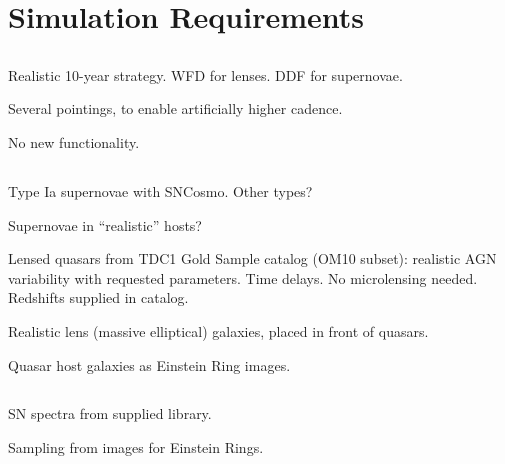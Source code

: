 \section{Simulation Requirements}
\def\secname{\chpname:simulations}
\label{\secname}



\subsection{\OpSim}

Realistic 10-year strategy. WFD for lenses. DDF for supernovae.

Several pointings, to enable artificially higher cadence.

No new functionality.


\subsection{\CatSim}

Type Ia supernovae with SNCosmo. Other types?

Supernovae in ``realistic'' hosts?

Lensed quasars from TDC1 Gold Sample catalog (OM10 subset):
realistic AGN variability with requested parameters. Time delays.
No microlensing needed. Redshifts supplied in catalog.

Realistic lens (massive elliptical) galaxies, placed in front of quasars.

Quasar host galaxies as Einstein Ring images.



\subsection{\PhoSim}

SN spectra from supplied library.

Sampling from images for Einstein Rings.


